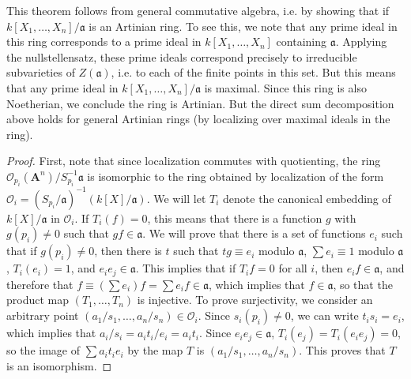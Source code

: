 \begin{remark}
    This theorem follows from general commutative algebra, i.e. by showing that if $k[X_1,\dots,X_n] / \mathfrak{a}$ is an Artinian ring. To see this, we note that any prime ideal in this ring corresponds to a prime ideal in $k[X_1,\dots,X_n]$ containing $\mathfrak{a}$. Applying the nullstellensatz, these prime ideals correspond precisely to irreducible subvarieties of $Z(\mathfrak{a})$, i.e. to each of the finite points in this set. But this means that any prime ideal in $k[X_1,\dots,X_n] / \mathfrak{a}$ is maximal. Since this ring is also Noetherian, we conclude the ring is Artinian. But the direct sum decomposition above holds for general Artinian rings (by localizing over maximal ideals in the ring).
\end{remark}

\begin{proof}
    First, note that since localization commutes with quotienting, the ring $\mathcal{O}_{p_i}(\mathbf{A}^n)/S_{p_i}^{-1} \mathfrak{a}$ is isomorphic to the ring obtained by localization of the form $\mathcal{O}_i = (S_{p_i}/\mathfrak{a})^{-1}(k[X]/\mathfrak{a})$. We will let $T_i$ denote the canonical embedding of $k[X]/\mathfrak{a}$ in $\mathcal{O}_i$. If $T_i(f) = 0$, this means that there is a function $g$ with $g(p_i) \neq 0$ such that $gf \in \mathfrak{a}$. We will prove that there is a set of functions $e_i$ such that if $g(p_i) \neq 0$, then there is $t$ such that $tg \equiv e_i$ modulo $\mathfrak{a}$, $\sum e_i \equiv 1$ modulo $\mathfrak{a}$, $T_i(e_i) = 1$, and $e_ie_j \in \mathfrak{a}$. This implies that if $T_if = 0$ for all $i$, then $e_if \in \mathfrak{a}$, and therefore that $f \equiv (\sum e_i)f = \sum e_if \in \mathfrak{a}$, which implies that $f \in \mathfrak{a}$, so that the product map $(T_1, \dots, T_n)$ is injective. To prove surjectivity, we consider an arbitrary point $(a_1/s_1, \dots, a_n/s_n) \in \mathcal{O}_i$. Since $s_i(p_i) \neq 0$, we can write $t_is_i = e_i$, which implies that $a_i/s_i = a_it_i/e_i = a_it_i$. Since $e_ie_j \in \mathfrak{a}$, $T_i(e_j) = T_i(e_ie_j) = 0$, so the image of $\sum a_it_ie_i$ by the map $T$ is $(a_1/s_1, \dots, a_n/s_n)$. This proves that $T$ is an isomorphism.


\end{proof}
